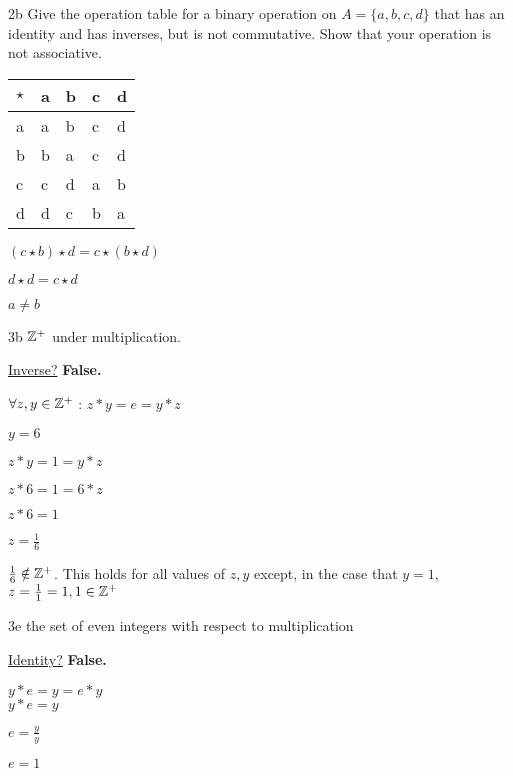 \begin{question}{2b}
Give the operation table for a binary operation on $A=\{a,b,c,d\}$ that has an identity and has inverses, but is not commutative. Show that your operation is not associative.
\end{question}

\begin{tabular}{l|llll}
$\star$ & a & b & c & d \\
\hline
a       & a & b & c & d \\
b       & b & a & c & d \\
c       & c & d & a & b \\
d       & d & c & b & a
\end{tabular}

$(c \star b) \star d =  c \star (b \star d)$

$d \star d =  c \star d$

$a\neq b$




\begin{question}{3b}
$\mathbb{Z}^+$ under multiplication.
\end{question}

\underline{Inverse?} \textbf{False.}

$\forall z,y \in \mathbb{Z}^+$ : $z * y = e = y * z$

$y=6$

$z * y = 1 = y * z$

$z * 6 = 1 = 6 * z$

$z * 6 = 1 $

$z = \frac{1}{6} $

$\frac{1}{6} \notin \mathbb{Z}^+$. This holds for all values of $z,y$ except, in the case that $y=1$, $z= \frac{1}{1} = 1, 1 \in \mathbb{Z}^+$

\begin{question}{3e}
the set of even integers with respect to multiplication
\end{question}

\underline{Identity?} \textbf{False.}

$y * e = y = e * y$\\

$y * e = y$

$e = \frac{y}{y}$

$e = 1$\\


